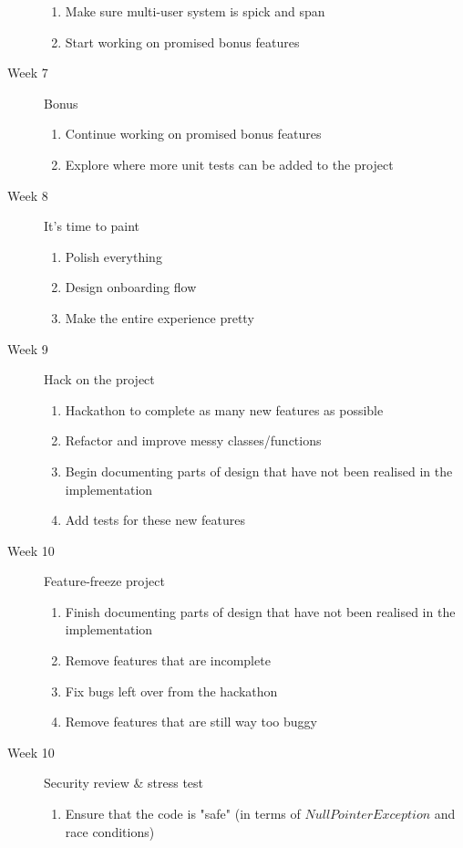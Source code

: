 \documentclass[a4paper]{article}
\begin{document}
\begin{description}
\begin{enumerate}
            \item Make sure multi-user system is spick and span
            \item Start working on promised bonus features
        \end{enumerate}
    \item[Week 7] Bonus
        \begin{enumerate}
            \item Continue working on promised bonus features
            \item Explore where more unit tests can be added to the project
        \end{enumerate}
    \item[Week 8] It's time to paint
        \begin{enumerate}
            \item Polish everything
            \item Design onboarding flow
            \item Make the entire experience pretty
        \end{enumerate}
    \item[Week 9] Hack on the project
        \begin{enumerate}
            \item Hackathon to complete as many new features as possible
            \item Refactor and improve messy classes/functions
            \item Begin documenting parts of design that have not been realised in the implementation
            \item Add tests for these new features
        \end{enumerate}
    \item[Week 10] Feature-freeze project
        \begin{enumerate}
            \item Finish documenting parts of design that have not been realised in the implementation
            \item Remove features that are incomplete
            \item Fix bugs left over from the hackathon
            \item Remove features that are still way too buggy
        \end{enumerate}
    \item[Week 10] Security review \& stress test
        \begin{enumerate}
            \item Ensure that the code is "safe" (in terms of $NullPointerException$ and race conditions)

\end{enumerate}
\end{description}
\end{document}

